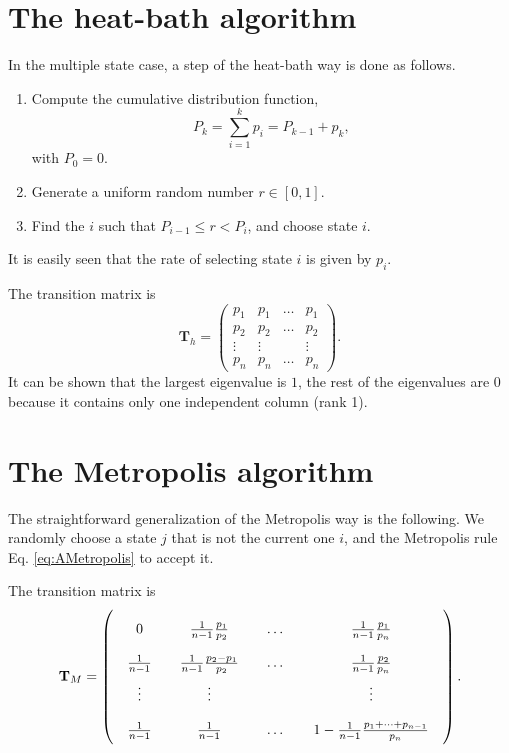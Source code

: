 \documentclass[12pt]{article}
\begin{document}
\section{The heat-bath algorithm}

In the multiple state case,
a step of the heat-bath way is done as follows.
%
\begin{enumerate}
  \item Compute the cumulative distribution function,
    $$
    P_k = \sum_{i=1}^k p_i = P_{k-1} + p_k,
    $$
    with $P_0 = 0$.
  \item Generate a uniform random number $r \in [0, 1]$.
  \item Find the $i$ such that $P_{i-1} \le r < P_i$,
    and choose state $i$.
\end{enumerate}
It is easily seen that the rate of selecting state $i$
is given by $p_i$.

The transition matrix is
$$
\mathbf T_h =
\left(
  \begin{array}{cccccc}
    p_1 & p_1 & \dots & p_1 \\
    p_2 & p_2 & \dots & p_2 \\
    \vdots & \vdots  &  & \vdots \\
    p_n & p_n & \dots & p_n
  \end{array}
\right).
$$
It can be shown that
the largest eigenvalue is $1$, the rest of the eigenvalues are $0$
because it contains only one independent column (rank 1).



\section{The Metropolis algorithm}


The straightforward generalization of the Metropolis way is the following.
We randomly choose a state $j$ that is not the current one $i$,
and the Metropolis rule Eq. \eqref{eq:AMetropolis} to accept it.

The transition matrix is
$$
\mathbf T_M =
\left(
  \arraycolsep=10.0pt\def\arraystretch{2.0}
  \begin{array}{cccccc}
    0   & \frac{1}{n-1}\frac{p_1}{p_2} & \dots & \frac{1}{n-1}\frac{p_1}{p_n} \\
    \frac{1}{n-1} & \frac{1}{n-1}\frac{p_2-p_1}{p_2} & \dots & \frac{1}{n-1}\frac{p_2}{p_n} \\
    \vdots & \vdots  &  & \vdots \\
    \frac{1}{n-1} & \frac{1}{n-1} & \dots & 1 - \frac{1}{n-1}\frac{p_1 + \cdots + p_{n-1}}{p_n}
  \end{array}
\right).
$$
\end{document}
